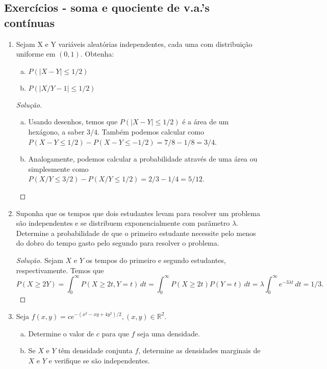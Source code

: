 \documentclass[../Notas.tex]{subfiles}
\begin{document}
\subsection{Exercícios - soma e quociente de v.a.'s contínuas}

\begin{enumerate}
    \item Sejam X e Y variáveis aleatórias independentes, cada uma com distribuição uniforme em $(0,1)$. Obtenha:
    \begin{enumerate}[a)]
    \item $P(|X - Y| \leq 1/2)$
    \item $P(|X/Y - 1 | \leq 1/2)$
    \end{enumerate}
    \begin{proof}[Solução]
        \begin{enumerate}[a)]
            \item Usando desenhos, temos que $P(|X-Y| \leq 1/2)$ é a área de um hexágono, a saber
            $3/4$. Também podemos calcular como $P(X-Y\leq 1/2) - P(X-Y\leq-1/2) = 7/8-1/8 = 3/4$.
            \item Analogamente, podemos calcular a probabilidade através de uma área ou simplesmente
            como $P(X/Y\leq 3/2) - P(X/Y\leq 1/2) = 2/3 - 1/4 = 5/12$.
        \end{enumerate}
    \end{proof}
    \item Suponha que os tempos que dois estudantes levam para resolver um problema são independentes e se distribuem exponencialmente com parâmetro $\lambda$. Determine a probabilidade de que o primeiro estudante necessite pelo menos do dobro do tempo gasto pelo segundo para resolver o problema.
    \begin{proof}[Solução]
        Sejam $X$ e $Y$ os tempos do primeiro e segundo estudantes, respectivamente. Temos que
        \[
        P(X\geq 2Y) = \int_0^{\infty} P(X\geq 2t, Y = t) \, dt 
                    = \int_0^{\infty} P(X\geq 2t)P(Y = t) \, dt
                    = \lambda\int_0^{\infty} e^{-3\lambda t} \, dt
                    = 1/3.
        \]
    \end{proof}
    \item Seja $f(x, y) = ce^{-(x^2-xy+4y^2)/2 }, (x, y) \in\mathbb{R}^2$.
    \begin{enumerate}[a)]
    \item Determine o valor de $c$ para que $f$ seja uma densidade.
    \item Se $X$ e $Y$ têm densidade conjunta $f$, determine as densidades marginais de $X$ e $Y$ e verifique se são independentes.

\end{enumerate}
\end{enumerate}
\end{document}
